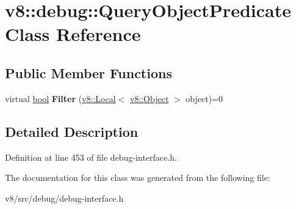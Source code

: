 \hypertarget{classv8_1_1debug_1_1QueryObjectPredicate}{}\section{v8\+:\+:debug\+:\+:Query\+Object\+Predicate Class Reference}
\label{classv8_1_1debug_1_1QueryObjectPredicate}
\subsection*{Public Member Functions}
\begin{DoxyCompactItemize}
\item 
\mbox{\label{classv8_1_1debug_1_1QueryObjectPredicate_a4c88040252d6921f008e4ce727ac7e7e}} 
virtual \mbox{\hyperlink{classbool}{bool}} {\bfseries Filter} (\mbox{\hyperlink{classv8_1_1Local}{v8\+::\+Local}}$<$ \mbox{\hyperlink{classv8_1_1Object}{v8\+::\+Object}} $>$ object)=0
\end{DoxyCompactItemize}


\subsection{Detailed Description}


Definition at line 453 of file debug-\/interface.\+h.



The documentation for this class was generated from the following file\+:\begin{DoxyCompactItemize}
\item 
v8/src/debug/debug-\/interface.\+h\end{DoxyCompactItemize}

